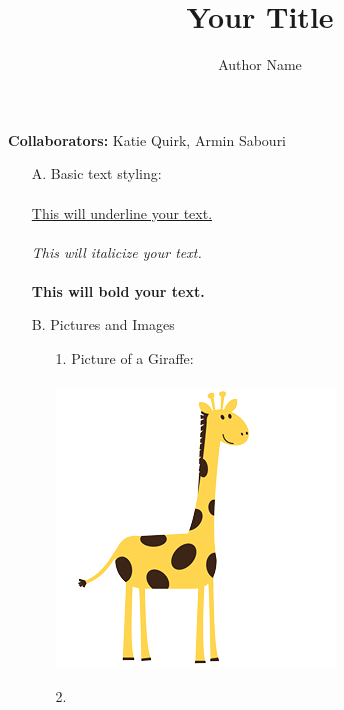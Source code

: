\documentclass[11pt]{article}
\providecommand{\myparab}[1]{\smallskip\noindent\textbf{#1} }
\theoremstyle{definition}
\begin{document}
\title{Your Title}
\author{Author Name}
\maketitle

\myparab{Collaborators: } Katie Quirk, Armin Sabouri \\

\noindent\hrulefill


\thispagestyle{fancy}
 
\begin{enumerate}
\item[A.] Basic text styling: \\
\\
\underline{This will underline your text.} \\
\\
\textit{This will italicize your text.}\\
\\
\textbf{This will bold your text.}

\item[B.] Pictures and Images %
    \begin{enumerate}
    \item[1.] Picture of a Giraffe: \\
    \\
    \includegraphics[scale=0.2]{giraffe-clipart-1.png}    %
    \\
    \item[2.] 
    \\
    \end{enumerate}
    

\end{enumerate}
\end{document}
